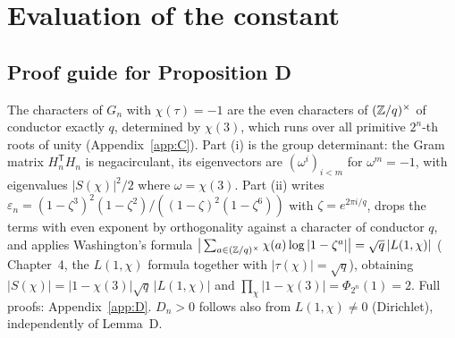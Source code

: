 \documentclass[11pt]{amsart}
\theoremstyle{remark}\newtheorem{remark}[theorem]{Remark}
\theoremstyle{definition}\newtheorem{definition}[theorem]{Definition}
\begin{document}
\section{Evaluation of the constant}\label{sec:const}
\subsection{Proof guide for Proposition D}
The characters of $G_n$ with $\chi(\tau)=-1$ are the even characters of $(\mathbb{Z}/q)^\times$ of conductor exactly $q$, determined by $\chi(3)$, which runs over all primitive $2^n$-th roots of unity (Appendix~\ref{app:C}). Part (i) is the group determinant: the Gram matrix $H_n^{\mathsf T}H_n$ is negacirculant, its eigenvectors are $(\omega^i)_{i<m}$ for $\omega^m=-1$, with eigenvalues $|S(\chi)|^2/2$ where $\omega=\chi(3)$. Part (ii) writes $\varepsilon_n=(1-\zeta^3)^2(1-\zeta^2)/((1-\zeta)^2(1-\zeta^6))$ with $\zeta=e^{2\pi i/q}$, drops the terms with even exponent by orthogonality against a character of conductor $q$, and applies Washington's formula $\big|\sum_{a\in(\mathbb{Z}/q)^\times}\chi(a)\log|1-\zeta^a|\big|=\sqrt q\,|L(1,\chi)|$ (\cite{Wash} Chapter~4, the $L(1,\chi)$ formula together with $|\tau(\chi)|=\sqrt q$), obtaining $|S(\chi)|=|1-\chi(3)|\sqrt q\,|L(1,\chi)|$ and $\prod_\chi|1-\chi(3)|=\Phi_{2^n}(1)=2$. Full proofs: Appendix~\ref{app:D}. $D_n>0$ follows also from $L(1,\chi)\ne0$ (Dirichlet), independently of Lemma~D.
\end{document}
